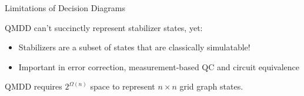 \begin{frame}[fragile]{Limitations of Decision Diagrams}


%
%  
%
%
%
%
%

\begin{alertblock}{QMDD can't succinctly represent stabilizer states, yet:}
	\begin{itemize}
		\item Stabilizers are a subset of states that are \alert{classically simulatable!}
		\item Important in error correction, measurement-based QC and circuit equivalence
	\end{itemize}
\end{alertblock}


\begin{theorem}%
QMDD requires $2^{\Omega({n})}$ space to represent 
	$n\times n$ grid graph states.
\end{theorem}


\begin{refsection}

\vfill


\end{refsection}
\end{frame}
